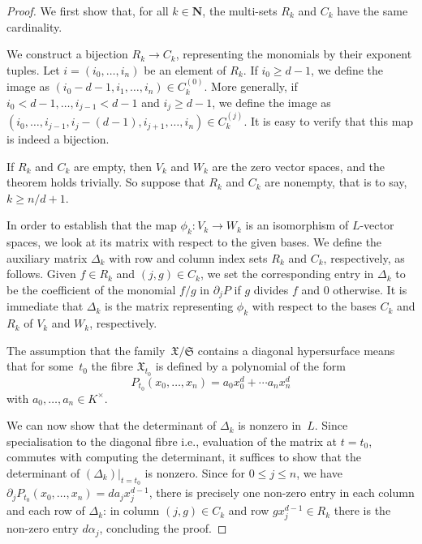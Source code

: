 \documentclass[a4paper,11pt]{article}
\numberwithin{equation}{section}
\newcommand{\NN}{\mathbf{N}} %
\renewcommand{\to}{\rightarrow}        %
\theoremstyle{definition}
\begin{document}
\begin{proof}
We first show that, for all $k \in \NN$, the multi-sets $R_k$ and $C_k$ 
have the same cardinality.

We construct a bijection $R_k \to C_k$, representing the 
monomials by their exponent tuples.  Let $i = (i_0, \dotsc, i_n)$ be an
element of $R_k$.  If $i_0 \geq d-1$, we define the image as
$(i_0-d-1, i_1, \dotsc, i_n) \in C_k^{(0)}$.  More generally, if 
$i_0 < d-1, \dotsc, i_{j-1} < d-1$ and $i_j \geq d-1$, we define the image as 
$(i_0, \dotsc, i_{j-1}, i_j-(d-1), i_{j+1}, \dotsc, i_n) \in C_k^{(j)}$.  
It is easy to verify that this map is indeed a bijection.

If $R_k$ and $C_k$ are empty, then $V_k$ and $W_k$ are the zero vector spaces, and
the theorem holds trivially. So suppose that $R_k$ and $C_k$ are nonempty, that is to
say, $k \geq n/d + 1$.

In order to establish that the map $\phi_k \colon V_k \to W_k$ is an 
isomorphism of $L$-vector spaces, we look at its matrix with respect to 
the given bases. We define the auxiliary matrix $\Delta_k$ with 
row and column index sets $R_k$ and $C_k$, respectively, as follows.  
Given $f \in R_k$ and $(j,g) \in C_k$, we set the corresponding entry in 
$\Delta_k$ to be the coefficient of the monomial $f/g$ in $\partial_j P$ if 
$g$ divides $f$ and $0$ otherwise.  It is immediate that $\Delta_k$ is the 
matrix representing $\phi_k$ with respect to the bases $C_k$ and $R_k$ of 
$V_k$ and $W_k$, respectively.

The assumption that the family~$\mathfrak{X}/\mathfrak{S}$ contains a diagonal 
hypersurface means that for some~$t_0$ the fibre $\mathfrak{X}_{t_0}$ is 
defined by a polynomial of the form 
\begin{equation}
P_{t_0}(x_0, \dotsc, x_n) = a_0 x_0^d + \dotsb a_n x_n^d
\end{equation}
with $a_0, \dotsc, a_n \in K^{\times}$.

We can now show that the determinant of $\Delta_k$ is nonzero in~$L$.  Since 
specialisation to the diagonal fibre i.e., evaluation of the matrix at 
$t = t_0$, commutes with computing the determinant, it suffices to show that 
the determinant of $(\Delta_k) \big |_{t=t_0}$ is nonzero.
Since for $0 \leq j \leq n$, we have $\partial_j P_{t_0} (x_0, \dotsc, x_n) = d a_j x_j^{d-1}$, 
there is precisely one non-zero entry in each column and each row of $\Delta_k$:  in column 
$(j, g) \in C_k$ and row $g x_j^{d-1} \in R_k$ there is the non-zero entry 
$d \alpha_j$, concluding the proof. \end{proof}
\end{document}
